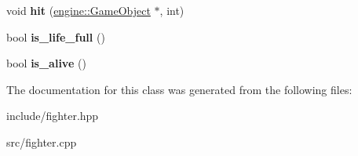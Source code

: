 \begin{DoxyCompactItemize}
\item 
void {\bfseries hit} (\hyperlink{classengine_1_1_game_object}{engine\+::\+Game\+Object} $\ast$, int)\hypertarget{classmindscape_1_1_fighter_a76feabe253ef5ca18450c9cf2df15bdf}{}\label{classmindscape_1_1_fighter_a76feabe253ef5ca18450c9cf2df15bdf}

\item 
bool {\bfseries is\+\_\+life\+\_\+full} ()\hypertarget{classmindscape_1_1_fighter_ae399b769b99f8ed693b86240382b6f0c}{}\label{classmindscape_1_1_fighter_ae399b769b99f8ed693b86240382b6f0c}

\item 
bool {\bfseries is\+\_\+alive} ()\hypertarget{classmindscape_1_1_fighter_acb398a29adbf1de62658e5ae96ac5cb6}{}\label{classmindscape_1_1_fighter_acb398a29adbf1de62658e5ae96ac5cb6}

\end{DoxyCompactItemize}


The documentation for this class was generated from the following files\+:\begin{DoxyCompactItemize}
\item 
include/fighter.\+hpp\item 
src/fighter.\+cpp\end{DoxyCompactItemize}
